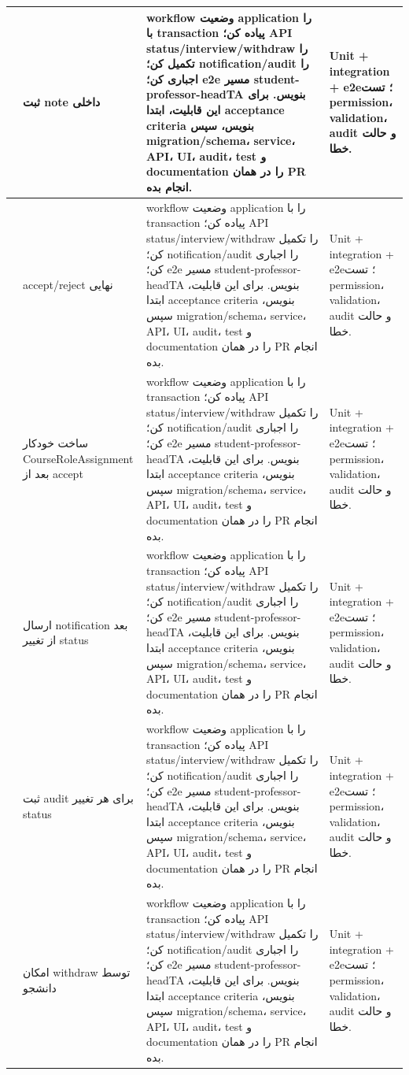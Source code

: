 \documentclass[11pt,a4paper]{article}
\begin{document}
\begin{longtable}{|>{\raggedleft\arraybackslash}p{}|>{\raggedleft\arraybackslash}p{}|>{\raggedleft\arraybackslash}p{}|>{\raggedleft\arraybackslash}p{}|}
68 & ثبت note داخلی & workflow وضعیت application را با transaction پیاده کن؛ API status/interview/withdraw را تکمیل کن؛ notification/audit را اجباری کن؛ e2e مسیر student-professor-headTA بنویس. برای این قابلیت، ابتدا acceptance criteria بنویس، سپس migration/schema، service، API، UI، audit، test و documentation را در همان PR انجام بده. & Unit + integration + e2e؛ تست permission، validation، audit و حالت خطا. \\ \hline
69 & accept/reject نهایی & workflow وضعیت application را با transaction پیاده کن؛ API status/interview/withdraw را تکمیل کن؛ notification/audit را اجباری کن؛ e2e مسیر student-professor-headTA بنویس. برای این قابلیت، ابتدا acceptance criteria بنویس، سپس migration/schema، service، API، UI، audit، test و documentation را در همان PR انجام بده. & Unit + integration + e2e؛ تست permission، validation، audit و حالت خطا. \\ \hline
70 & ساخت خودکار CourseRoleAssignment بعد از accept & workflow وضعیت application را با transaction پیاده کن؛ API status/interview/withdraw را تکمیل کن؛ notification/audit را اجباری کن؛ e2e مسیر student-professor-headTA بنویس. برای این قابلیت، ابتدا acceptance criteria بنویس، سپس migration/schema، service، API، UI، audit، test و documentation را در همان PR انجام بده. & Unit + integration + e2e؛ تست permission، validation، audit و حالت خطا. \\ \hline
71 & ارسال notification بعد از تغییر status & workflow وضعیت application را با transaction پیاده کن؛ API status/interview/withdraw را تکمیل کن؛ notification/audit را اجباری کن؛ e2e مسیر student-professor-headTA بنویس. برای این قابلیت، ابتدا acceptance criteria بنویس، سپس migration/schema، service، API، UI، audit، test و documentation را در همان PR انجام بده. & Unit + integration + e2e؛ تست permission، validation، audit و حالت خطا. \\ \hline
72 & ثبت audit برای هر تغییر status & workflow وضعیت application را با transaction پیاده کن؛ API status/interview/withdraw را تکمیل کن؛ notification/audit را اجباری کن؛ e2e مسیر student-professor-headTA بنویس. برای این قابلیت، ابتدا acceptance criteria بنویس، سپس migration/schema، service، API، UI، audit، test و documentation را در همان PR انجام بده. & Unit + integration + e2e؛ تست permission، validation، audit و حالت خطا. \\ \hline
73 & امکان withdraw توسط دانشجو & workflow وضعیت application را با transaction پیاده کن؛ API status/interview/withdraw را تکمیل کن؛ notification/audit را اجباری کن؛ e2e مسیر student-professor-headTA بنویس. برای این قابلیت، ابتدا acceptance criteria بنویس، سپس migration/schema، service، API، UI، audit، test و documentation را در همان PR انجام بده. & Unit + integration + e2e؛ تست permission، validation، audit و حالت خطا. \\ \hline

\end{longtable}
\end{document}
